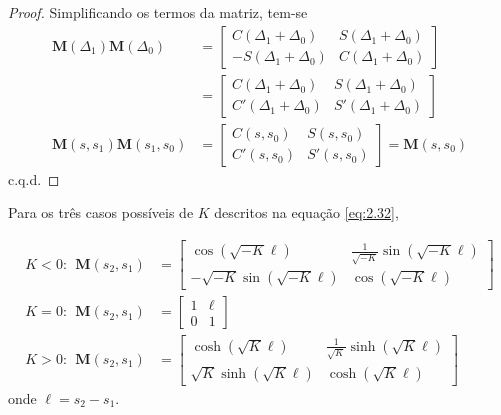 \begin{proof}
	Simplificando os termos da matriz, tem-se
	\begin{align*}
        \boldsymbol{M}(\Delta_1)\boldsymbol{M}(\Delta_0) &= \begin{bmatrix}
        C(\Delta_1+\Delta_0) & S(\Delta_1+\Delta_0)\\
        -S(\Delta_1+\Delta_0) & C(\Delta_1+\Delta_0)
        \end{bmatrix}\\
        &= \begin{bmatrix}
            C(\Delta_1+\Delta_0) & S(\Delta_1+\Delta_0)\\
            C'(\Delta_1+\Delta_0) & S'(\Delta_1+\Delta_0)
            \end{bmatrix}\\
        \boldsymbol{M}(s,s_1)\boldsymbol{M}(s_1,s_0)&= \begin{bmatrix}
            C(s,s_0) & S(s,s_0)\\
            C'(s,s_0) & S'(s,s_0)
            \end{bmatrix} = \boldsymbol{M}(s,s_0) 
	\end{align*}
	c.q.d.
\end{proof}
	
Para os três casos possíveis de $K$ descritos na equação \eqref{eq:2.32},
	
\begin{align}
	K<0: \ \ \boldsymbol{M}(s_2,s_1) &= \begin{bmatrix}
	\cos(\sqrt{-K}\ell) & \frac{1}{\sqrt{-K}}\sin(\sqrt{-K}\ell)\\
	-\sqrt{-K}\sin(\sqrt{-K}\ell) & \cos(\sqrt{-K}\ell)
	\end{bmatrix}\\
	K=0: \ \ \boldsymbol{M}(s_2,s_1) &= \begin{bmatrix}
		1 & \ell\\
		0 & 1
		\end{bmatrix}\\
	K>0: \ \ \boldsymbol{M}(s_2,s_1) &= \begin{bmatrix}
		\cosh(\sqrt{K}\ell) & \frac{1}{\sqrt{K}}\sinh(\sqrt{K}\ell)\\
		\sqrt{K}\sinh(\sqrt{K}\ell) & \cosh(\sqrt{K}\ell)
		\end{bmatrix}
\end{align}
onde $\ell = s_2-s_1$.
	
